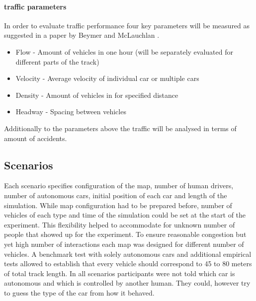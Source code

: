\documentclass[11pt,english]{article}
\begin{document}









\paragraph{traffic parameters}

In order to evaluate traffic performance four key parameters will be measured as suggested in a paper by Beymer and McLauchlan \citep{beymer1997real}. 

\begin{itemize}
  \item Flow - Amount of vehicles in one hour (will be separately evaluated for different parts of the track)
  \item Velocity - Average velocity of individual car or multiple cars
  \item Density - Amount of vehicles in for specified distance
  \item Headway - Spacing between vehicles
\end{itemize}

Additionally to the parameters above the traffic will be analysed in terms of amount of accidents.



\subsection{Scenarios}

Each scenario specifies configuration of the map, number of human drivers, number of autonomous cars, initial position of each car and length of the simulation. 
While map configuration had to be prepared before, number of vehicles of each type and time of the simulation could be set at the start of the experiment. This flexibility helped to accommodate for unknown number of people that showed up for the experiment. To ensure reasonable congestion but yet high number of interactions each map was designed for different number of vehicles. A benchmark test with solely autonomous cars and additional empirical tests allowed to establish that every vehicle should correspond to 45 to 80 meters of total track length. In all scenarios participants were not told which car is autonomous and which is controlled by another human. They could, however try to guess the type of the car from how it behaved. 
\end{document}
